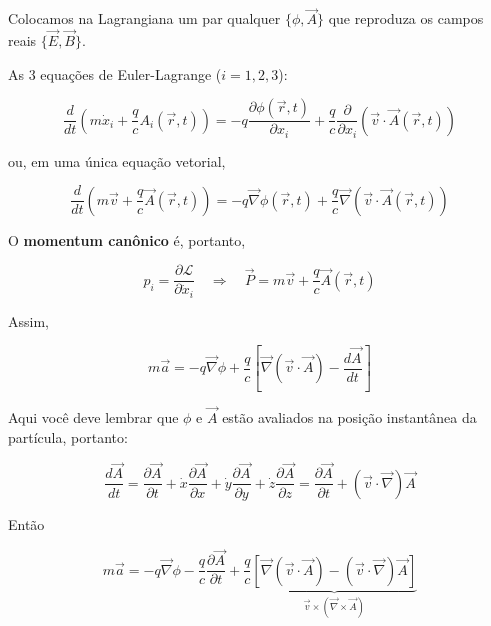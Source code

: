 Colocamos na Lagrangiana um par qualquer $\{\phi, \vec{A}\}$ que reproduza os campos reais $\{\vec{E}, \vec{B}\}$.

As 3 equações de Euler-Lagrange ($i = 1, 2, 3$):

\begin{equation}
\frac{d}{dt}\left(m\dot{x}_i + \frac{q}{c}A_i(\vec{r}, t)\right) = -q\frac{\partial \phi(\vec{r}, t)}{\partial x_i} + \frac{q}{c}\frac{\partial}{\partial x_i}\left(\vec{v}\cdot\vec{A}(\vec{r}, t)\right)
\label{eq:aula8_el_em_componentes}
\end{equation}

ou, em uma única equação vetorial,

\begin{equation}
\frac{d}{dt}\left(m\vec{v} + \frac{q}{c}\vec{A}(\vec{r}, t)\right) = -q\vec{\nabla}\phi(\vec{r}, t) + \frac{q}{c}\vec{\nabla}\left(\vec{v}\cdot\vec{A}(\vec{r}, t)\right)
\label{eq:aula8_el_em_vetorial}
\end{equation}

O \textbf{momentum canônico} é, portanto,

\begin{equation}
p_i = \frac{\partial \mathcal{L}}{\partial \dot{x}_i} \quad \Longrightarrow \quad \boxed{\vec{P} = m\vec{v} + \frac{q}{c}\vec{A}(\vec{r}, t)}
\label{eq:aula8_momentum_canonico}
\end{equation}

Assim,

\begin{equation}
m\vec{a} = -q\vec{\nabla}\phi + \frac{q}{c}\left[\vec{\nabla}(\vec{v}\cdot\vec{A}) - \frac{d\vec{A}}{dt}\right]
\label{eq:aula8_ma_intermediario}
\end{equation}

Aqui você deve lembrar que $\phi$ e $\vec{A}$ estão avaliados na posição instantânea da partícula, portanto:

\begin{equation}
\frac{d\vec{A}}{dt} = \frac{\partial \vec{A}}{\partial t} + \dot{x}\frac{\partial \vec{A}}{\partial x} + \dot{y}\frac{\partial \vec{A}}{\partial y} + \dot{z}\frac{\partial \vec{A}}{\partial z} = \frac{\partial \vec{A}}{\partial t} + (\vec{v}\cdot\vec{\nabla})\vec{A}
\label{eq:aula8_derivada_total_A}
\end{equation}

Então

\begin{equation}
m\vec{a} = -q\vec{\nabla}\phi - \frac{q}{c}\frac{\partial \vec{A}}{\partial t} + \frac{q}{c}\underbrace{\left[\vec{\nabla}(\vec{v}\cdot\vec{A}) - (\vec{v}\cdot\vec{\nabla})\vec{A}\right]}_{\vec{v}\times(\vec{\nabla}\times\vec{A})}
\label{eq:aula8_ma_identidade}
\end{equation}

